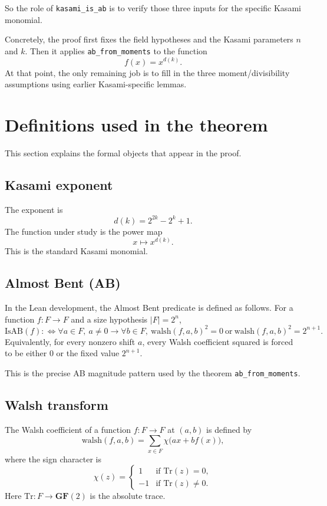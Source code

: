 \documentclass[11pt]{article}
\begin{document}
So the role of \texttt{kasami\_is\_ab} is to verify those three inputs for the specific Kasami monomial.

Concretely, the proof first fixes the field hypotheses and the Kasami parameters $n$ and $k$. Then it applies \texttt{ab\_from\_moments} to the function
\[
  f(x) = x^{d(k)}.
\]
At that point, the only remaining job is to fill in the three moment/divisibility assumptions using earlier Kasami-specific lemmas.

\section{Definitions used in the theorem}
This section explains the formal objects that appear in the proof.

\subsection{Kasami exponent}
The exponent is
\[
  d(k) = 2^{2k} - 2^k + 1.
\]
The function under study is the power map
\[
  x \mapsto x^{d(k)}.
\]
This is the standard Kasami monomial.

\subsection{Almost Bent (AB)}
In the Lean development, the Almost Bent predicate is defined as follows. For a function $f : F \to F$ and a size hypothesis $|F| = 2^n$,
\[
  \mathrm{IsAB}(f) :\!\iff \forall a \in F,\ a \neq 0 \rightarrow \forall b \in F,\
  \mathrm{walsh}(f,a,b)^2 = 0 \ \text{or}\ \mathrm{walsh}(f,a,b)^2 = 2^{n+1}.
\]
Equivalently, for every nonzero shift $a$, every Walsh coefficient squared is forced to be either $0$ or the fixed value $2^{n+1}$.

This is the precise AB magnitude pattern used by the theorem \texttt{ab\_from\_moments}.

\subsection{Walsh transform}
The Walsh coefficient of a function $f : F \to F$ at $(a,b)$ is defined by
\[
  \mathrm{walsh}(f,a,b) = \sum_{x \in F} \chi\bigl(a x + b f(x)\bigr),
\]
where the sign character is
\[
  \chi(z) = \begin{cases}
  1 & \text{if } \mathrm{Tr}(z)=0,\\
  -1 & \text{if } \mathrm{Tr}(z)\neq 0.
  \end{cases}
\]
Here $\mathrm{Tr} : F \to \mathbf{GF}(2)$ is the absolute trace.
\end{document}
